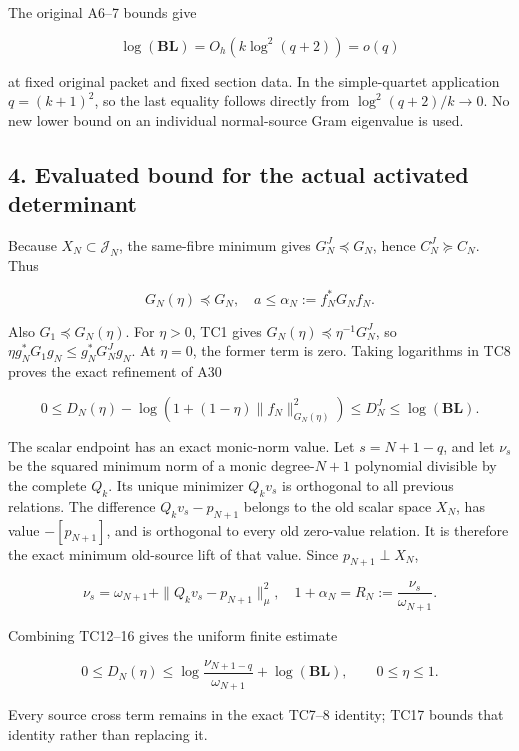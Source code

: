 \documentclass[11pt]{article}
\begin{document}
The original A6--7 bounds give

\[
\log(\mathbf B\mathbf L)=O_h(k\log^2(q+2))=o(q)
\tag{TC13}
\]

at fixed original packet and fixed section data. In the simple-quartet application \(q=(k+1)^2\), so the last equality follows directly from \(\log^2(q+2)/k\to0\). No new lower bound on an individual normal-source Gram eigenvalue is used.

\subsection{4. Evaluated bound for the actual activated determinant}\label{evaluated-bound-for-the-actual-activated-determinant}

Because \(X_N\subset\mathcal J_N\), the same-fibre minimum gives \(G_N^J\preceq G_N\), hence \(C_N^J\succeq C_N\). Thus

\[
G_N(\eta)\preceq G_N,
\quad a\le\alpha_N:=f_N^*G_Nf_N.
\tag{TC14}
\]

Also \(G_1\preceq G_N(\eta)\). For \(\eta>0\), TC1 gives \(G_N(\eta)\preceq\eta^{-1}G_N^J\), so \(\eta g_N^*G_1g_N\le g_N^*G_N^Jg_N\). At \(\eta=0\), the former term is zero. Taking logarithms in TC8 proves the exact refinement of A30

\[
\boxed{
0\le D_N(\eta)-\log(1+(1-\eta)\|f_N\|_{G_N(\eta)}^2)
\le D_N^J\le\log(\mathbf B\mathbf L).
}
\tag{TC15}
\]

The scalar endpoint has an exact monic-norm value. Let \(s=N+1-q\), and let \(\nu_s\) be the squared minimum norm of a monic degree-\(N+1\) polynomial divisible by the complete \(Q_k\). Its unique minimizer \(Q_kv_s\) is orthogonal to all previous relations. The difference \(Q_kv_s-p_{N+1}\) belongs to the old scalar space \(X_N\), has value \(-[p_{N+1}]\), and is orthogonal to every old zero-value relation. It is therefore the exact minimum old-source lift of that value. Since \(p_{N+1}\perp X_N\),

\[
\nu_s=\omega_{N+1}+\|Q_kv_s-p_{N+1}\|_\mu^2,
\quad
1+\alpha_N=R_N:=\frac{\nu_s}{\omega_{N+1}}.
\tag{TC16}
\]

Combining TC12--16 gives the uniform finite estimate

\[
\boxed{0\le D_N(\eta)\le
\log\frac{\nu_{N+1-q}}{\omega_{N+1}}
+\log(\mathbf B\mathbf L),\qquad 0\le\eta\le1.}
\tag{TC17}
\]

Every source cross term remains in the exact TC7--8 identity; TC17 bounds that identity rather than replacing it.
\end{document}
